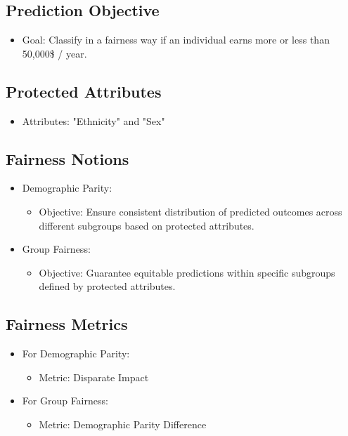 \subsection{Prediction Objective}

\begin{itemize}
    \item Goal: Classify in a fairness way if an individual earns more or less than 50,000\$ / year.
\end{itemize}

\subsection{Protected Attributes}

\begin{itemize}
    \item Attributes: "Ethnicity" and "Sex"
\end{itemize}

\subsection{Fairness Notions}

\begin{itemize}
    \item Demographic Parity:
    \begin{itemize}
        \item Objective: Ensure consistent distribution of predicted outcomes across different subgroups based on protected attributes.
    \end{itemize}
    
    \item Group Fairness:
    \begin{itemize}
        \item Objective: Guarantee equitable predictions within specific subgroups defined by protected attributes.
    \end{itemize}
\end{itemize}

\subsection{Fairness Metrics}

\begin{itemize}
    \item For Demographic Parity:
    \begin{itemize}
        \item Metric: Disparate Impact
    \end{itemize}
    
    \item For Group Fairness:
    \begin{itemize}
        \item Metric: Demographic Parity Difference
    \end{itemize}
\end{itemize}

